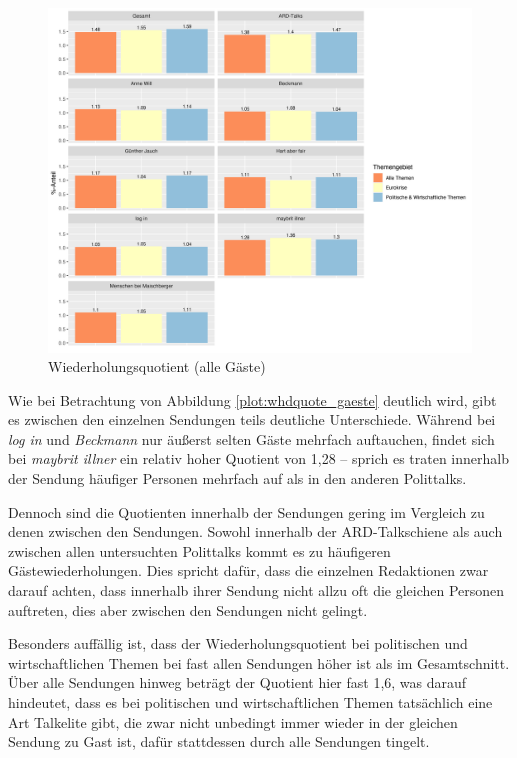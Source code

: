 \begin{figure}[ht]
	\centering
	\includegraphics[width=1\textwidth]{daten/grafiken/plot_wdhquote_gaeste.png}
	\caption{Wiederholungsquotient (alle Gäste)}
	\label{plot:whdquote_gaeste}
\end{figure}

Wie bei Betrachtung von Abbildung \vref{plot:whdquote_gaeste} deutlich wird, gibt es zwischen den einzelnen Sendungen teils deutliche Unterschiede. Während bei \textit{log in} und \textit{Beckmann} nur äußerst selten Gäste mehrfach auftauchen, findet sich bei \textit{maybrit illner} ein relativ hoher Quotient von 1,28 – sprich es traten innerhalb der Sendung häufiger Personen mehrfach auf als in den anderen Polittalks.

Dennoch sind die Quotienten innerhalb der Sendungen gering im Vergleich zu denen zwischen den Sendungen. Sowohl innerhalb der ARD-Talkschiene als auch zwischen allen untersuchten Polittalks kommt es zu häufigeren Gästewiederholungen. Dies spricht dafür, dass die einzelnen Redaktionen zwar darauf achten, dass innerhalb ihrer Sendung nicht allzu oft die gleichen Personen auftreten, dies aber zwischen den Sendungen nicht gelingt.

Besonders auffällig ist, dass der Wiederholungsquotient bei politischen und wirtschaftlichen Themen bei fast allen Sendungen höher ist als im Gesamtschnitt. Über alle Sendungen hinweg beträgt der Quotient hier fast 1,6, was darauf hindeutet, dass es bei politischen und wirtschaftlichen Themen tatsächlich eine Art Talkelite gibt, die zwar nicht unbedingt immer wieder in der gleichen Sendung zu Gast ist, dafür stattdessen durch alle Sendungen tingelt.

